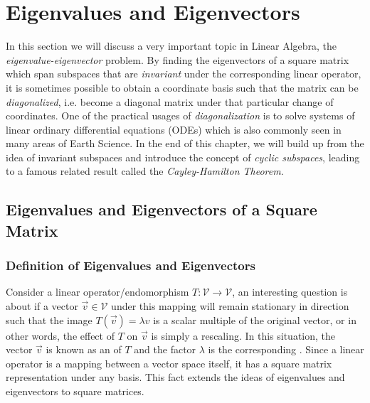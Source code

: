 \chapter{Eigenvalues and Eigenvectors}

In this section we will discuss a very important topic in Linear Algebra, the \textit{eigenvalue-eigenvector} problem. By finding the eigenvectors of a square matrix which span subspaces that are \textit{invariant} under the corresponding linear operator, it is sometimes possible to obtain a coordinate basis such that the matrix can be \textit{diagonalized}, i.e. become a diagonal matrix under that particular change of coordinates. One of the practical usages of \textit{diagonalization} is to solve systems of linear ordinary differential equations (ODEs) which is also commonly seen in many areas of Earth Science. In the end of this chapter, we will build up from the idea of invariant subspaces and introduce the concept of \textit{cyclic subspaces}, leading to a famous related result called the \textit{Cayley-Hamilton Theorem}.

\section{Eigenvalues and Eigenvectors of a Square Matrix}
\label{section:eigensection}

\subsection{Definition of Eigenvalues and Eigenvectors}

Consider a linear operator/endomorphism $T: \mathcal{V} \to \mathcal{V}$, an interesting question is about if a vector $\vec{v} \in \mathcal{V}$ under this mapping will remain stationary in direction such that the image $T(\vec{v}) = \lambda v$ is a scalar multiple of the original vector, or in other words, the effect of $T$ on $\vec{v}$ is simply a rescaling. In this situation, the vector $\vec{v}$ is known as an  of $T$ and the factor $\lambda$ is the corresponding . Since a linear operator is a mapping between a vector space itself, it has a square matrix representation under any basis. This fact extends the ideas of eigenvalues and eigenvectors to square matrices.

